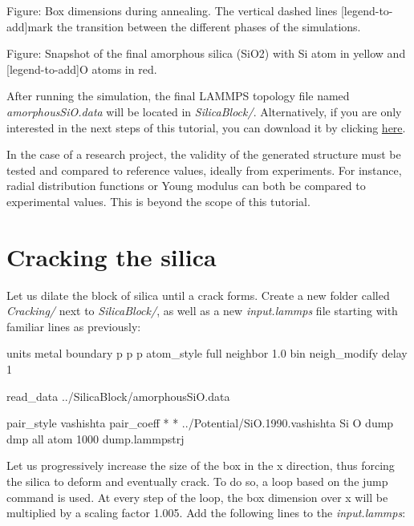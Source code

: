 \vspace{0.25cm} Figure: Box dimensions during annealing. The vertical dashed lines
[legend-to-add]mark the transition between the different phases of the simulations.

\vspace{0.25cm} Figure: Snapshot of the final amorphous silica (SiO2) with Si atom in yellow and
[legend-to-add]O atoms in red.

\vspace{0.25cm} \noindent After running the simulation, the final LAMMPS topology file named
\textit{amorphousSiO.data} will be located in \textit{SilicaBlock/}. Alternatively, if you are only interested in the
next steps of this tutorial, you can download it by clicking
\href{https://lammpstutorials.github.io/lammpstutorials-inputs/level3/water-adsorption-in-silica/SilicaBlock/amorphousSiO.data}{here}.

\begin{tcolorbox}[colback=mylightblue!5!white,colframe=mylightblue!75!black,title=Tip for research project]

\vspace{0.25cm} \noindent In the case of a research project, the validity of the generated
structure must be tested and compared to reference values, ideally from
experiments. For instance, radial distribution functions or Young modulus
can both be compared to experimental values. This is beyond the
scope of this tutorial.
\end{tcolorbox}

\noindent \section{Cracking the silica}
Let us dilate the block of silica until a
crack forms. Create a new folder called \textit{Cracking/} next to \textit{SilicaBlock/},
as well as a new \textit{input.lammps} file starting with familiar lines as
previously:

\begin{lcverbatim}
units metal
boundary p p p
atom_style full
neighbor 1.0 bin
neigh_modify delay 1

read_data ../SilicaBlock/amorphousSiO.data

pair_style vashishta
pair_coeff * * ../Potential/SiO.1990.vashishta Si O
dump dmp all atom 1000 dump.lammpstrj
\end{lcverbatim}

\noindent Let us progressively increase the size of the
box in the x direction, thus forcing the silica to deform
and eventually crack. To do
so, a loop based on the jump command is used. At
every step of the loop, the box dimension over x will
be multiplied by a scaling factor 1.005. Add the following lines to
the \textit{input.lammps}:

